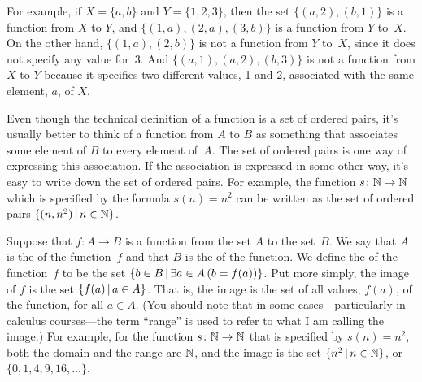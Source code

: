 For example, if $X=\{a,b\}$ and $Y=\{1,2,3\}$, then the
set $\{(a,2), (b,1)\}$ is a function from $X$ to $Y$,
and $\{(1,a), (2,a), (3,b)\}$ is a function from $Y$ to~$X$.
On the other hand, $\{(1,a),(2,b)\}$ is not a function from
$Y$ to~$X$, since it does not specify any value for~3.
And $\{(a,1),(a,2),(b,3)\}$ is not a function from $X$ to
$Y$ because it specifies two different values, 1 and 2, 
associated with the same element, $a$, of $X$.

Even though the technical definition of a function is a set
of ordered pairs, it's usually better to think of a function
from $A$ to $B$ as something that associates some element of
$B$ to every element of~$A$.  The set of ordered pairs is one
way of expressing this association.  If the association is
expressed in some other way, it's easy to write down the
set of ordered pairs.  For example, the function
$s\colon{\mathbb N}\to{\mathbb N}$ which is specified by the formula
$s(n)=n^2$ can be written as the set of ordered
pairs $\{(n,n^2)\,|\, n\in {\mathbb N}\}$.

\medbreak

Suppose that $f\colon A\to B$ is a function from the set
$A$ to the set~$B$.  We say that $A$ is the  of
the function~$f$ and that $B$ is the  of the function.
We define the  of the function~$f$ to be the
set $\{b\in B\,|\, \exists a\in A\,(b=f(a))\}$.  Put
more simply, the image of $f$ is the set $\{f(a)\,|\, a\in A\}$.
That is, the image is the set of all values, $f(a)$, of the
function, for all $a\in A$.  (You should note that in some
cases---particularly in calculus courses---the term ``range''
is used to refer to what I am calling the image.)
For example, for the function $s\colon{\mathbb N}\to{\mathbb N}$ that is specified
by $s(n)=n^2$, both the domain and the range are ${\mathbb N}$, and
the image is the set $\{n^2\,|\, n\in{\mathbb N}\}$, or $\{0,1,4,9,16,\dots\}$.


